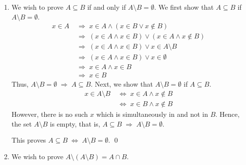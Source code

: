 \documentclass[10pt]{article}
\begin{document}
\begin{enumerate}
                \item
                We wish to prove $A \subseteq B$ if and only if $A \setminus B = \emptyset$. We first show that $A \subseteq B$ if $A \setminus B = \emptyset$.
                \begin{align*}
                        x \in A
                                \;&\Rightarrow\; x \in A \land (x \in B \lor x \notin B)\\
                                \;&\Rightarrow\; (x \in A \land x \in B) \lor (x \in A \land x \notin B)\\
                                \;&\Rightarrow\; (x \in A \land x \in B) \lor x \in A \setminus B\\
                                \;&\Rightarrow\; (x \in A \land x \in B) \lor x \in \emptyset   \tag{$A \setminus B = \emptyset$}\\
                                \;&\Rightarrow\; x \in A \land x \in B                          \tag{$x \in A$}\\
                                \;&\Rightarrow\; x \in B
                \end{align*}
                Thus, $A \setminus B = \emptyset \;\Rightarrow\; A \subseteq B$. Next, we show that $A \setminus B = \emptyset$ if $A \subseteq B$.
                \begin{align*}
                        x \in A \setminus B
                                \;&\Leftrightarrow\; x \in A \land x \notin B\\
                                \;&\Leftrightarrow\; x \in B \land x \notin B                   \tag{$A \subseteq B$}
                \end{align*}
                However, there is no such $x$ which is simultaneously in and not in $B$. Hence, the set $A \setminus B$ is empty, that is,
                $A \subseteq B \;\Rightarrow\; A \setminus B = \emptyset$.

                This proves $A \subseteq B \;\Leftrightarrow\; A \setminus B = \emptyset$. \qed


                \item
                We wish to prove $A \setminus (A \setminus B) = A \cap B$.
                

\end{enumerate}
\end{document}
